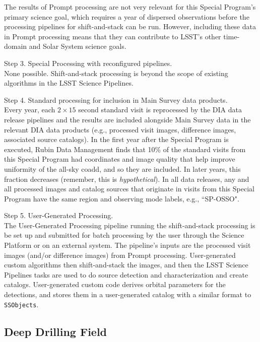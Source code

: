 The results of Prompt processing are not very relevant for this Special Program's primary science goal,
which requires a year of dispersed observations before the processing pipelines for shift-and-stack can be run.
However, including these data in Prompt processing means that
they can contribute to LSST's other time-domain and Solar System science goals.

Step 3. Special Processing with reconfigured pipelines. \\
None possible. 
Shift-and-stack processing is beyond the scope of existing algorithms in the LSST Science Pipelines.

Step 4. Standard processing for inclusion in Main Survey data products. \\
Every year, each $2\times15$ second standard visit is reprocessed by the DIA data release pipelines
and the results are included alongside Main Survey data in the relevant DIA data products
(e.g., processed visit images, difference images, associated source catalogs).
In the first year after the Special Program is executed,
Rubin Data Management finds that 10\% of the standard visits from this Special Program
had coordinates and image quality that help improve uniformity of the all-sky coadd,
and so they are included.
In later years, this fraction decreases (remember, this is \emph{hypothetical}).
In all data releases, any and all processed images and catalog sources that originate in visits from this Special Program
have the same region and observing mode labels, e.g., ``SP-OSSO".

Step 5. User-Generated Processing. \\
The User-Generated Processing pipeline running the shift-and-stack processing is be set up and submitted 
for batch processing by the user through the Science Platform or on an external system. 
The pipeline's inputs are the processed visit images (and/or difference images) from Prompt processing.
User-generated custom algorithms then shift-and-stack the images, and then the LSST Science Pipelines
tasks are used to do source detection and characterization and create catalogs.
User-generated custom code derives orbital parameters for the detections, and stores
them in a user-generated catalog with a similar format to {\tt SSObjects}.


\subsection{Deep Drilling Field}\label{ssec:SPCS_SNDDF}

